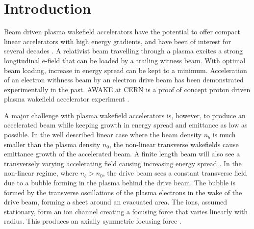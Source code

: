 \documentclass[aps,prstab,reprint,amsmath,amssymb,groupedaddress]{revtex4-1}
\begin{document}
\section[\label{S:I}]{Introduction}

Beam driven plasma wakefield accelerators have the potential to offer compact linear accelerators with high energy
gradients, and have been of interest for several decades \cite{chen:1985}. A relativist beam travelling through a plasma
excites a strong longitudinal e-field that can be loaded by a trailing witness beam. With optimal beam loading, increase
in energy spread can be kept to a minimum. Acceleration of an electron withness beam by an electron drive beam has been
demonstrated experimentally \cite{rosenzweig:1988, blumenfeld:2007, kallos:2008} in the past. AWAKE at CERN is a proof
of concept proton driven plasma wakefield accelerator experiment \cite{awake_collaboration:2014}.

A major challenge with plasma wakefield accelerators is, however, to produce an accelerated beam while keeping growth in
energy spread and emittance as low as possible. In the well described linear case where the beam density $n_{b}$ is much
smaller than the plasma density $n_{0}$, the non-linear transverse wakefields cause emittance growth of the accelerated
beam. A finite length beam will also see a transversely varying accelerating field causing increasing energy spread
\cite{katsouleas:1987}. In the non-linear regime, where $n_{b} > n_{0}$, the drive beam sees a constant transverse field
due to a bubble forming in the plasma behind the drive beam. The bubble is formed by the transverse oscillations of the
plasma electrons in the wake of the drive beam, forming a sheet around an evacuated area. The ions, assumed stationary,
form an ion channel creating a focusing force that varies linearly with radius. This
produces an axially symmetric focusing force \cite{lu:2006-1, lu:2006}.
\end{document}
